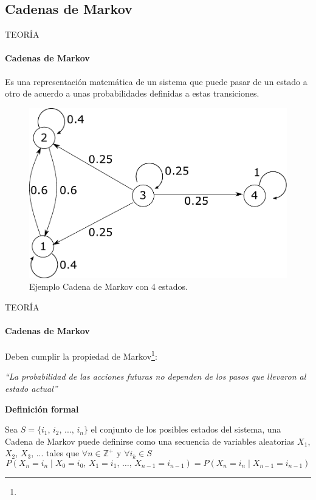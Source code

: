 \subsection{Cadenas de Markov}
\begin{frame}{TEORÍA}
    \framesubtitle{Cadenas de Markov}
    Es una representación matemática de un sistema que puede pasar de un estado a otro de acuerdo a unas probabilidades definidas a estas transiciones.
    \begin{figure}[H]
        \centering
        \includegraphics[scale=0.3]{files/Markov.pdf}
        \caption{Ejemplo Cadena de Markov con 4 estados\footnotemark{}.}
    \end{figure}
\end{frame}

\begin{frame}{TEORÍA}
    \framesubtitle{Cadenas de Markov}
    Deben cumplir la propiedad de Markov\footnote{}:
    \begin{center}
        \textit{``La probabilidad de las acciones futuras no dependen de los pasos que llevaron al estado actual''}
    \end{center}
    \textbf{Definición formal}

    Sea $S=\{i_1$, $i_2$, $...$, $i_n\}$ el conjunto de los posibles estados del sistema, una Cadena de Markov puede definirse como una secuencia de variables aleatorias $X_1$, $X_2$, $X_3$, $...$ tales que $\forall n\in \mathbb{Z^+}$ y $\forall i_k\in S$
    \begin{equation}
        P(X_n = i_n \mid X_0 = i_0, \, X_1 = i_1, \, \dots, \, X_{n-1} = i_{n-1}) = P(X_n = i_n \mid X_{n-1} = i_{n-1})
    \end{equation}
\end{frame}



